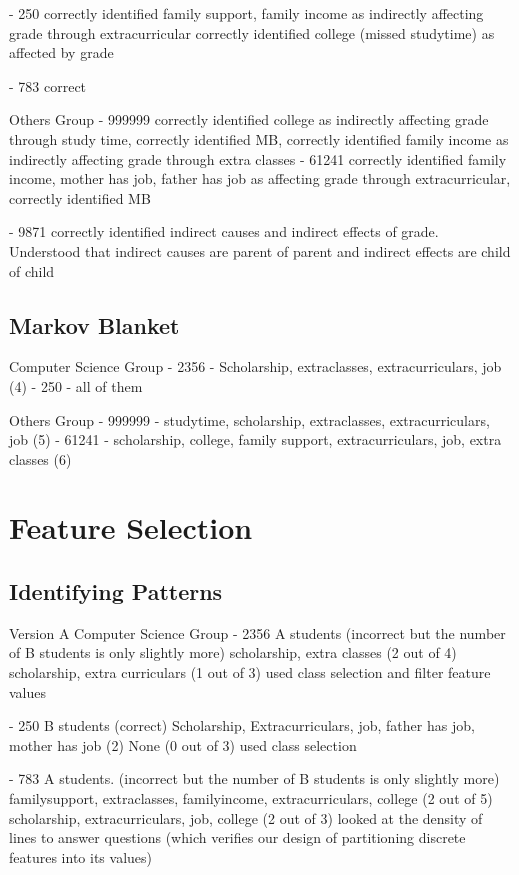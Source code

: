 - 250 
    correctly identified family support, family income as indirectly affecting grade through extracurricular
    correctly identified college (missed studytime) as affected by grade

- 783 
    correct 

Others Group
- 999999 
    correctly identified college as indirectly affecting grade through study time, 
    correctly identified MB, 
    correctly identified family income as indirectly affecting grade through extra classes 
- 61241 
    correctly identified family income, mother has job, father has job as affecting grade through extracurricular,
    correctly identified MB
    
- 9871
    correctly identified indirect causes and indirect effects of grade. Understood that indirect causes are parent of parent and indirect effects are child of child

\subsection { Markov Blanket }
Computer Science Group 
- 2356 - Scholarship, extraclasses, extracurriculars, job (4)
- 250 - all of them

Others Group
- 999999 - studytime, scholarship, extraclasses, extracurriculars, job (5)
- 61241 - scholarship, college, family support, extracurriculars, job, extra classes (6)

\section {Feature Selection}

\subsection { Identifying Patterns }
Version A
Computer Science Group 
- 2356 
    A students (incorrect but the number of B students is only slightly more) 
    scholarship, extra classes (2 out of 4)
    scholarship, extra curriculars (1 out of 3) 
    used class selection and filter feature values
    
- 250
    B students (correct)
    Scholarship, Extracurriculars, job, father has job, mother has job (2)
    None (0 out of 3)
    used class selection

- 783 
    A students. (incorrect but the number of B students is only slightly more) 
    familysupport, extraclasses, familyincome, extracurriculars, college (2 out of 5) 
    scholarship, extracurriculars, job, college (2 out of 3) 
    looked at the density of lines to answer questions (which verifies our design of partitioning discrete features into its values)

